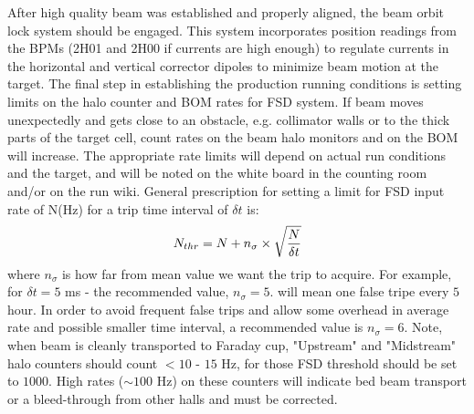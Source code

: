 After high quality beam was established and properly aligned, the beam orbit lock system should be engaged. This system incorporates position readings from the BPMs (2H01 and 2H00 if currents are high enough) to regulate 
currents in the horizontal and vertical corrector dipoles to minimize beam motion at the target.  The final step in establishing the production running conditions is setting 
limits on the halo counter and BOM rates for FSD system. If beam moves unexpectedly and gets close to an obstacle, e.g. 
collimator walls or to the thick parts of the target cell, count rates on the beam halo monitors and on the BOM will increase. The appropriate rate limits will depend on actual run conditions and the target, and will be noted on the white board in the counting room and/or on the run wiki. General prescription for setting a limit for FSD input rate of N(Hz) for a trip time interval of $\delta t$ is:
\begin{eqnarray*}
N_{thr}=N+n_\sigma\times\sqrt{N\over{\delta t}}
\end{eqnarray*}
where $n_\sigma$ is how far from mean value we want the trip to acquire. For example, for $\delta t=5$ ms - the recommended value, $n_\sigma=5.$ will mean one false tripe every $5$ hour. In order to avoid frequent false trips and allow some overhead in average rate and possible smaller time interval, a recommended value is $n_\sigma=6$. Note, when beam is cleanly transported to Faraday cup, "Upstream" and "Midstream" halo counters should count $<10$ - $15$ Hz, for those FSD threshold should be set to $1000$. High rates ($\sim 100$ Hz) on these counters will indicate bed beam transport or a bleed-through from other halls and must be corrected.

